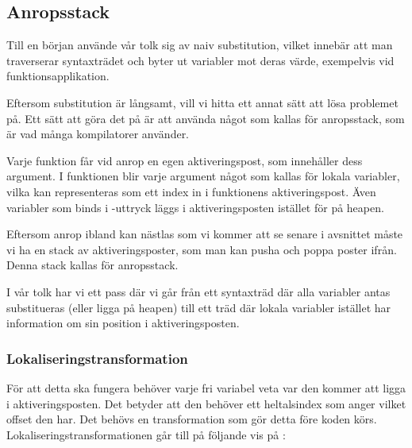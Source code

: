 \documentclass[../Core]{subfiles}
\begin{document}
\subsection{Anropsstack}
\label{sec:CallStack}

Till en början använde vår tolk sig av naiv substitution, vilket innebär att man
traverserar syntaxträdet och byter ut variabler mot deras värde, exempelvis vid
funktionsapplikation.

Eftersom substitution är långsamt, vill vi hitta ett annat sätt att lösa problemet
på. Ett sätt att göra det på är att använda något som kallas för anropsstack, som
är vad många kompilatorer använder. %

Varje funktion får vid anrop en egen aktiveringspost, som innehåller dess argument.
I funktionen blir varje argument något som kallas för lokala variabler, vilka kan representeras
som ett index in i funktionens aktiveringspost. Även variabler som binds i
-uttryck läggs i aktiveringsposten istället för på heapen. 
  
Eftersom anrop ibland kan nästlas som vi kommer att se senare i avsnittet
måste vi ha en stack av aktiveringsposter, som man kan pusha och poppa poster ifrån.
Denna stack kallas för anropsstack.

I vår tolk har vi ett pass där vi går från ett syntaxträd där alla variabler
antas substitueras (eller ligga på heapen) till ett träd där lokala variabler
istället har information om sin position i aktiveringsposten.




\subsubsection{Lokaliseringstransformation}

För att detta ska fungera behöver varje fri variabel veta var den kommer att
ligga i aktiveringsposten. Det betyder att den behöver ett heltalsindex som anger
vilket offset den har. Det behövs en transformation som gör detta före koden 
körs. Lokaliseringstransformationen går till på följande vis på : 
\end{document}

